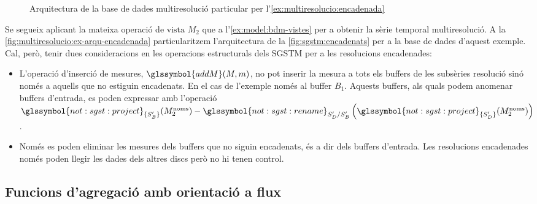 \begin{example} 
  \begin{figure}[tp]
    \centering
    
    \caption{Arquitectura de la base de dades multiresolució
      particular per l'\autoref{ex:multiresolucio:encadenada}}
    \label{fig:multiresolucio:ex-arqu-encadenada}
  \end{figure}



  Se segueix aplicant la mateixa operació de $\text{vista } M_2$ que a
  l'\autoref{ex:model:bdm-vistes} per a obtenir la sèrie temporal
  multiresolució. A la \autoref{fig:multiresolucio:ex-arqu-encadenada}
  particularitzem l'arquitectura de la \autoref{fig:sgstm:encadenats}
  per a la base de dades d'aquest exemple. Cal, però, tenir dues
  consideracions en les operacions estructurals dels \gls{SGSTM} per a
  les resolucions encadenades: 

  \begin{itemize}
  \item L'operació d'inserció de mesures, $\glssymbol{addM}(M,m)$, no
    pot inserir la mesura a tots els buffers de les subsèries
    resolució sinó només a aquells que no estiguin encadenats. En el
    cas de l'exemple només al buffer $B_1$.  Aquests buffers, als
    quals podem anomenar buffers d'entrada, es poden expressar amb
    l'operació $ \glssymbol{not:sgst:project}_{\{S'_B\}}(
    M_2^{\text{noms}} ) -
    \glssymbol{not:sgst:rename}_{S'_D/S'_B}\left(
      \glssymbol{not:sgst:project}_{\{S'_D\}}( M_2^{\text{noms}}
      )\right)$.


  \item Només es poden eliminar les mesures dels buffers que no siguin
    encadenats, és a dir dels buffers d'entrada. Les resolucions
    encadenades només poden llegir les dades dels altres discs però
    no hi tenen control.

  \end{itemize}







\end{example}









\subsection{Funcions d'agregació amb orientació a flux}



